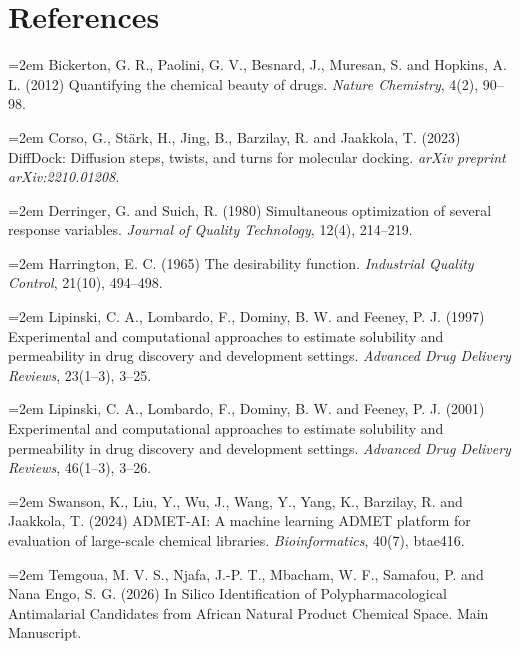 \documentclass[journal=jcisd8,manuscript=suppinfo]{achemso}
\begin{document}
\section*{References}

\noindent\hangindent=2em Bickerton, G. R., Paolini, G. V., Besnard, J., Muresan, S. and Hopkins, A. L. (2012) Quantifying the chemical beauty of drugs. \textit{Nature Chemistry}, 4(2), 90--98.

\noindent\hangindent=2em Corso, G., Stärk, H., Jing, B., Barzilay, R. and Jaakkola, T. (2023) DiffDock: Diffusion steps, twists, and turns for molecular docking. \textit{arXiv preprint arXiv:2210.01208}.

\noindent\hangindent=2em Derringer, G. and Suich, R. (1980) Simultaneous optimization of several response variables. \textit{Journal of Quality Technology}, 12(4), 214--219.

\noindent\hangindent=2em Harrington, E. C. (1965) The desirability function. \textit{Industrial Quality Control}, 21(10), 494--498.

\noindent\hangindent=2em Lipinski, C. A., Lombardo, F., Dominy, B. W. and Feeney, P. J. (1997) Experimental and computational approaches to estimate solubility and permeability in drug discovery and development settings. \textit{Advanced Drug Delivery Reviews}, 23(1--3), 3--25.

\noindent\hangindent=2em Lipinski, C. A., Lombardo, F., Dominy, B. W. and Feeney, P. J. (2001) Experimental and computational approaches to estimate solubility and permeability in drug discovery and development settings. \textit{Advanced Drug Delivery Reviews}, 46(1--3), 3--26.

\noindent\hangindent=2em Swanson, K., Liu, Y., Wu, J., Wang, Y., Yang, K., Barzilay, R. and Jaakkola, T. (2024) ADMET-AI: A machine learning ADMET platform for evaluation of large-scale chemical libraries. \textit{Bioinformatics}, 40(7), btae416.

\noindent\hangindent=2em Temgoua, M. V. S., Njafa, J.-P. T., Mbacham, W. F., Samafou, P. and Nana Engo, S. G. (2026) In Silico Identification of Polypharmacological Antimalarial Candidates from African Natural Product Chemical Space. Main Manuscript.
\end{document}
